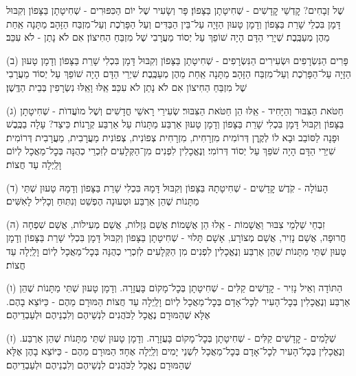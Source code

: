 %
שֶׁל זְבָחִים? קׇדְשֵׁי קׇדָשִׁים - שְׁחִיטָתָן בַּצָּפוֹן׃ פָּר וְשָׂעִיר שֶׁל יוֹם הַכִּפּוּרִים - שְׁחִיטָתָן בַּצָּפוֹן \middot וְקִבּוּל דָּמָן בִּכְלֵי שָׁרֵת בַּצָּפוֹן \middot וְדָמָן טָעוּן הַזָּיָה עַל־בֵּין הַבַּדִּים וְעַל הַפָּרֹֽכֶת וְעַל־מִזְבַּח הַזָּהָב׃ מַתָּנָה אַֽחַת מֵהֶן מְעַכֶּֽבֶת׃ שְׁיָרֵי הַדָּם הָיָה שׁוֹפֵךְ עַל יְסוֹד מַעֲרָבִי שֶׁל מִזְבֵּחַ הַחִיצוֹן׃ אִם לֹא נָתַן - לֹא עִכֵּב׃

(ב) פָּרִים הַנִּשְׂרָפִים וּשְׂעִירִים הַנִּשְׂרָפִים - שְׁחִיטָתָן בַּצָּפוֹן \middot וְקִבּוּל דָּמָן בִּכְלִי שָׁרֵת בַּצָּפוֹן \middot וְדָמָן טָעוּן הַזָּיָה עַל־הַפָּרֹֽכֶת וְעַל־מִזְבַּח הַזָּהָב׃ מַתָּנָה אַֽחַת מֵהֶן מְעַכֶּֽבֶת׃ שִׁיְרֵי הַדָּם הָיָה שׁוֹפֵךְ עַל יְסוֹד מַעֲרָבִי שֶׁל מִזְבֵּחַ הַחִיצוֹן אִם לֹא נָתַן לֹא עִכֵּב׃ אֵֽלּוּ וָאֵֽלּוּ נִשְׂרָפִין בְּבֵית הַדֶּֽשֶׁן׃

(ג) חַטֹּאת הַצִּבּוּר וְהַיָּחִיד - אֵֽלּוּ הֵן חַטֹּאת הַצִּבּוּר׃ שְׂעִירֵי רָאשֵׁי חֳדָשִׁים וְשֶׁל מוׁעֲדוׂת - שְׁחִיטָתָן בַּצָּפוֹן \middot וְקִבּוּל דָּמָן בִּכְלִי שָׁרֵת בַּצָּפוֹן \middot וְדָמָן טָעוּן אַרְבַּע מַתָּנוֹת עַל אַרְבַּע קְרָנוֹת׃ כֵּיצַד? עָלָה בַכֶּֽבֶשׁ \middot וּפָנָה לַסּוֹבֵב \middot וּבָא לוֹ לְקֶֽרֶן דְּרוֹמִית מִזְרָחִית, מִזְרָחִית צְפוֹנִית, צְפוֹנִית מַעֲרָבִית, מַעֲרָבִית דְּרוֹמִית׃ שִׁיְּרֵי הַדָּם הָיָה שֹׁפֵךְ עַל יְסוֹד דְּרוֹמִי׃ וְנֶאֱכָלִין לִפְנִים מִן־הַקְּלָעִים לְזִכְרֵי כְהֻנָּה בְּכׇל־מַאֲכָל לְיוֹם וָלַֽיְלָה עַד חֲצוֹת׃

(ד) הָעוֹלָה - קֹֽדֶשׁ קׇדָשִׁים - שְׁחִיטָתָהּ בַּצָּפוֹן \middot וְקִבּוּל דָּמָהּ בִּכְלִי שָׁרֵת בַּצָּפוֹן \middot וְדָמָהּ טָעוּן שְׁתֵּי מַתָּנוֹת שֶׁהֵן אַרְבַּע \middot וּטְעוּנָה הֶפְשֵׁט וְנִתּֽוּחַ וְכָלִיל לָאִשִּׁים׃

(ה) זִבְחֵי שַׁלְמֵי צִבּוּר וַאֲשָׁמוֹת - אֵֽלוּ הֵן אֲשָׁמוֹת׃ אֲשַׁם גְּזֵלוֹת, אֲשַׁם מְעִילוֹת, אֲשַׁם שִׁפְחָה חֲרוּפָה, אֲשַׁם נָזִיר, אֲשַׁם מְצוֹרָע, אָשָׁם תָּלוּי - שְׁחִיטָתָן בַּצָּפוֹן \middot וְקִבּוּל דָּמָן בִּכְלִי שָׁרֵת בַּצָּפוֹן \middot וְדָמָן טָעוּן שְׁתֵּי מַתָּנוֹת שֶׁהֵן אַרְבַּע \middot וְנֶאֱכָלִין לִפְנִים מִן הַקְּלָעִים לְזִכְרֵי כְהֻנָּה בְּכׇל־מַאֲכָל לְיוֹם וָלַֽיְלָה עַד חֲצוֹת׃

(ו) הַתּוֹדָה וְאֵיל נָזִיר - קׇדָשִׁים קַלִּים - שְׁחִיטָתָן בְּכׇל־מָקוֹם בָּעֲזָרָה. וְדָמָן טָעוּן שְׁתֵּי מַתָּנוֹת שֶׁהֵן אַרְבַּע \middot וְנֶאֱכָלִין בְּכׇל־הָעִיר לְכׇל־אָדָם בְּכׇל־מַאֲכָל לְיוֹם וָלַֽיְלָה עַד חֲצוֹת׃ הַמּוּרָם מֵהֶם - כַּיּוֹצֵא בָהֶם. אֶלָּא שֶׁהַמּוּרָם נֶאֱכָל לַכֹּהֲנִים לִנְשֵׁיהֶם וְלִבְנֵיהֶם וּלְעַבְדֵיהֶם׃

(ז) שְׁלָמִים - קׇדָשִׁים קַלִּים - שְׁחִיטָתָן בְּכׇל־מָקוֹם בָּעֲזָרָה. וְדָמָן טָעוּן שְׁתֵּי מַתָּנוֹת שֶׁהֵן אַרְבַּע. וְנֶאֱכָלִין בְּכׇל־הָעִיר לְכׇל־אָדָם בְּכׇל־מַאֲכָל לִשְׁנֵי יָמִים וְלַֽיְלָה אֶחָד׃ הַמּוּרָם מֵהֶם - כַּיּוֹצֵא בָהֶן \middot אֶלָּא שֶׁהַמּוּרָם נֶאֱכָל לַכֹּהֲנִים לִנְשֵׁיהֶם וְלִבְנֵיהֶם וּלְעַבְדֵיהֶם׃

